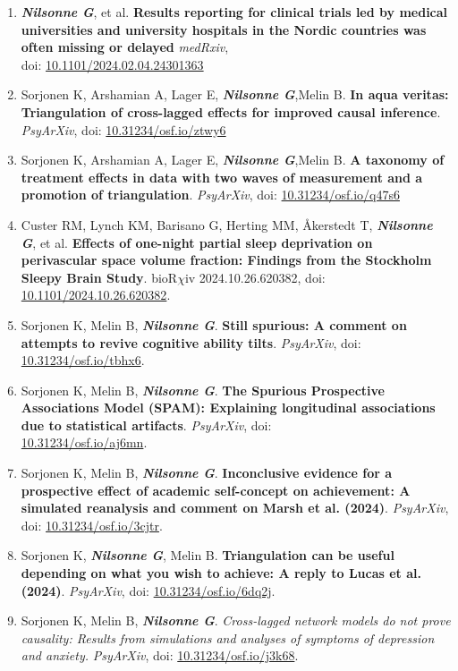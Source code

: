 \documentclass[10pt]{article}
\begin{document}
\begin{enumerate}[nolistsep]
\emph{PsyArXiv}, doi: \href{https://doi.org/10.31234/osf.io/hferw}{10.31234/osf.io/hferw}
\item \textbf{\textit{Nilsonne G}}, et al. \textbf{Results reporting for clinical trials led by medical universities and university hospitals in the Nordic countries was often missing or delayed} \emph{medRxiv}, \\
doi: \href{https://doi.org/10.1101/2024.02.04.24301363}{10.1101/2024.02.04.24301363}
\item Sorjonen K, Arshamian A, Lager E, \textbf{\textit{Nilsonne G}},Melin B. \textbf{In aqua veritas: Triangulation of cross-lagged effects for improved causal inference}. 
\emph{PsyArXiv}, doi: \href{https://doi.org/10.31234/osf.io/ztwy6}{10.31234/osf.io/ztwy6}
\item Sorjonen K, Arshamian A, Lager E, \textbf{\textit{Nilsonne G}},Melin B. \textbf{A taxonomy of treatment effects in data with two waves of measurement and a promotion of triangulation}. 
\emph{PsyArXiv}, doi: \href{https://doi.org/10.31234/osf.io/q47s6}{10.31234/osf.io/q47s6}
\item Custer RM, Lynch KM, Barisano G, Herting MM, Åkerstedt T, \textbf{\textit{Nilsonne G}}, et al. \textbf{Effects of one-night partial sleep deprivation on perivascular space volume fraction: Findings from the Stockholm Sleepy Brain Study}. bioR$\chi$iv 2024.10.26.620382, doi: \href{http://dx.doi.org/10.1101/2024.10.26.620382}{10.1101/2024.10.26.620382}.
\item Sorjonen K, Melin B, \textbf{\textit{Nilsonne G}}. \textbf{Still spurious: A comment on attempts to revive cognitive ability tilts}. \emph{PsyArXiv}, doi: \href{https://doi.org/10.31234/osf.io/tbhx6}{10.31234/osf.io/tbhx6}.
\item Sorjonen K, Melin B, \textbf{\textit{Nilsonne G}}. \textbf{The Spurious Prospective Associations Model (SPAM): Explaining longitudinal associations due to statistical artifacts}. \emph{PsyArXiv}, doi: \\
\href{https://doi.org/10.31234/osf.io/aj6mn}{10.31234/osf.io/aj6mn}.
\item Sorjonen K, Melin B, \textbf{\textit{Nilsonne G}}. \textbf{Inconclusive evidence for a prospective effect of academic self-concept on achievement: A simulated reanalysis and comment on Marsh et al. (2024)}. \emph{PsyArXiv}, doi: \href{https://doi.org/10.31234/osf.io/3cjtr}{10.31234/osf.io/3cjtr}.
\item Sorjonen K, \textbf{\textit{Nilsonne G}}, Melin B. \textbf{Triangulation can be useful depending on what you wish to achieve: A reply to Lucas et al. (2024)}. \emph{PsyArXiv}, doi: \href{https://doi.org/10.31234/osf.io/6dq2j}{10.31234/osf.io/6dq2j}.
\item Sorjonen K, Melin B, \textbf{\textit{Nilsonne G}}. \emph{Cross-lagged network models do not prove causality: Results from simulations and analyses of symptoms of depression and anxiety.} \emph{PsyArXiv}, doi: \href{https://doi.org/10.31234/osf.io/j3k68}{10.31234/osf.io/j3k68}.



\end{enumerate}
\end{document}
